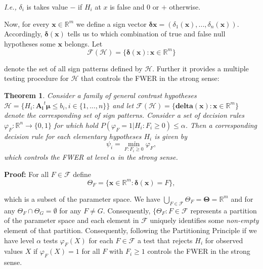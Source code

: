 \documentclass[a4paper,12pt]{article}
\newtheorem{theorem}{Theorem}
\newenvironment{proof}[1][Proof]{\noindent\textbf{#1:} }{}
\newcommand{\bs}[1]{\boldsymbol{#1}}
\newcommand{\R}{\mathbb{R}}
\begin{document}
{\em I.e.,} $\delta_i$ is takes value $-$ if $H_i$ at $x$ is false and
$0$ or $+$ otherwise.

Now, for every $\bs{x} \in \mathbb{R}^m$ we define a sign vector
$\bs{\delta}{\bs{x}}=
(\delta_1(\bs{x}),...,\delta_n(\bs{x}))$. Accordingly,
$\bs{\delta}(\bs{x})$ tells us to which 
combination of true and false null hypotheses some $\bs{x}$
belongs. Let
\begin{equation}
\label{eq:faces}
\mathcal{F}(\mathscr{H}) = \{\bs{\delta}(\bs{x}): \bs{x} \in \R^m\}
\end{equation}

denote the set of all sign patterns defined by 
$\mathscr{H}$.  Further it
provides a multiple testing procedure for $\mathscr{H}$ that controls
the FWER in the strong sense:

\begin{theorem}
  Consider a family of general contrast hypotheses $\mathscr{H} =
  \{H_i: \bs{A_i}^t\bs{\mu} \leq b_i,i \in \{1,...,n\}\}$ and let
  $\mathscr{F}(\mathscr{H}) = \{ \bs{delta}(\bs{x}): \bs{x} \in
  \R^m\}$ denote the corresponding set of sign patterns. Consider a
  set of decision rules $\varphi_F: \R^n \rightarrow \{0,1\}$ for
  which hold $P(\varphi_F = 1 | H_i: F_i \geq 0) \leq \alpha$. Then a
  corresponding decision rule for each elementary hypotheses $H_i$ is
  given by 
  \begin{equation}
    \label{eq:signtest}
    \psi_i = \min_{F: F_i \geq 0} \varphi_F,
  \end{equation}
  which controls the FWER at level $\alpha$ in the strong sense. 
\end{theorem}


\begin{proof}
  For all $F \in \mathcal{F}$ define
  \begin{equation}
    \label{eq:partition}
    \Theta_F = \{\bs{x} \in \R^m: \bs{\delta}(\bs{x}) = F\},
  \end{equation}

  which is a subset of the parameter space. We have $\bigcup_{F \in
    \mathcal{F}} \Theta_F = \bs{\Theta} = \R^m$ and for any $\Theta_F
  \cap \Theta_G = \emptyset$ for any $F \neq G$. Consequently,
  $\{\Theta_F:F \in \mathcal{F}$ represents a partition of the
  parameter space and each element in $\mathcal{F}$ uniquely
  identifies some {\em non-empty} element of that
  partition. Consequently, following the Partitioning Principle
  \cite[]{finner2002partitioning} if we have level $\alpha$ tests
  $\varphi_F(X)$ for each $F \in \mathcal{F}$ a test that rejects
  $H_i$ for observed values $X$ if $\varphi_F(X) = 1$ for all $F$ with
  $F_i \geq 1$ controls the FWER in the strong sense.
\end{proof}
\end{document}
